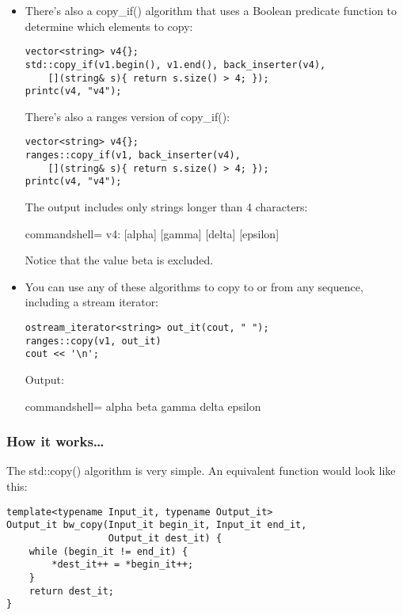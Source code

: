 \begin{itemize}
\item 
There's also a copy\_if() algorithm that uses a Boolean predicate function to determine which elements to copy:

\begin{lstlisting}[style=styleCXX]
vector<string> v4{};
std::copy_if(v1.begin(), v1.end(), back_inserter(v4),
	[](string& s){ return s.size() > 4; });
printc(v4, "v4");
\end{lstlisting}

There's also a ranges version of copy\_if():

\begin{lstlisting}[style=styleCXX]
vector<string> v4{};
ranges::copy_if(v1, back_inserter(v4),
	[](string& s){ return s.size() > 4; });
printc(v4, "v4");
\end{lstlisting}

The output includes only strings longer than 4 characters:

\begin{tcblisting}{commandshell={}}
v4: [alpha] [gamma] [delta] [epsilon]
\end{tcblisting}

Notice that the value beta is excluded.

\item 
You can use any of these algorithms to copy to or from any sequence, including a stream iterator:

\begin{lstlisting}[style=styleCXX]
ostream_iterator<string> out_it(cout, " ");
ranges::copy(v1, out_it)
cout << '\n';
\end{lstlisting}

Output:

\begin{tcblisting}{commandshell={}}
alpha beta gamma delta epsilon
\end{tcblisting}
\end{itemize}

\subsubsection{How it works…}

The std::copy() algorithm is very simple. An equivalent function would look like this:

\begin{lstlisting}[style=styleCXX]
template<typename Input_it, typename Output_it>
Output_it bw_copy(Input_it begin_it, Input_it end_it,
				  Output_it dest_it) {
	while (begin_it != end_it) {
		*dest_it++ = *begin_it++;
	}
	return dest_it;
}
\end{lstlisting}

